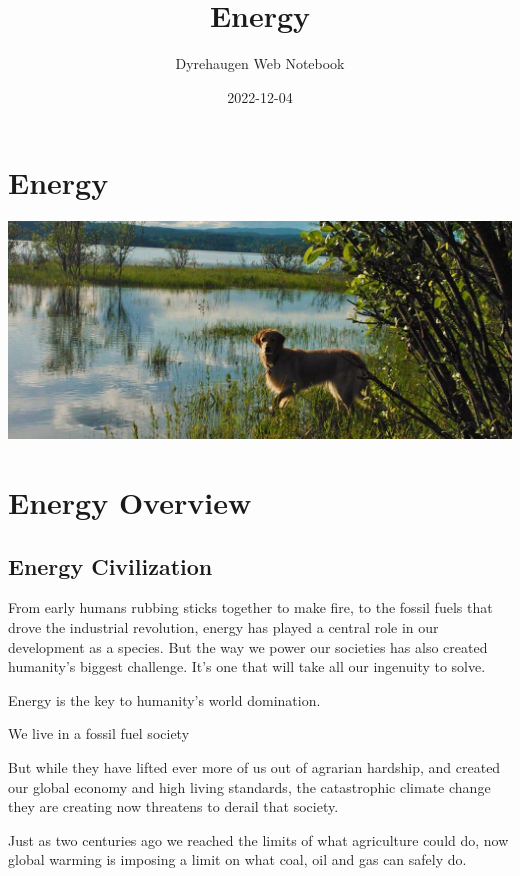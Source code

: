 \documentclass[
]{book}
\title{Energy}
\author{Dyrehaugen Web Notebook}
\date{2022-12-04}
\begin{document}
\maketitle

{
\setcounter{tocdepth}{1}
\tableofcontents
}
\hypertarget{energy}{%
\chapter{Energy}\label{energy}}

\includegraphics{fig/zelda.jpg}

\hypertarget{energy-overview}{%
\chapter{Energy Overview}\label{energy-overview}}

\hypertarget{energy-civilization}{%
\section{Energy Civilization}\label{energy-civilization}}

From early humans rubbing sticks together to make fire, to the fossil fuels that drove the industrial revolution, energy has played a central role in our development as a species. But the way we power our societies has also created humanity's biggest challenge. It's one that will take all our ingenuity to solve.

Energy is the key to humanity's world domination.

We live in a fossil fuel society

But while they have lifted ever more of us out of agrarian hardship, and created our global economy and high living standards, the catastrophic climate change they are creating now threatens to derail that society.

Just as two centuries ago we reached the limits of what agriculture could do, now global warming is imposing a limit on what coal, oil and gas can safely do.
\end{document}
